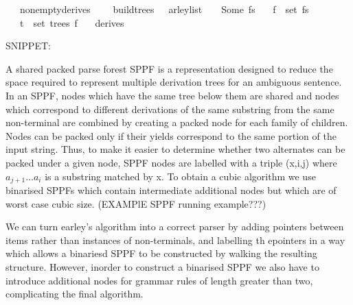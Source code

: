 \begin{isabellebody}
\ \ \ {\isachardoublequoteopen}nonempty{\isacharunderscore}{\kern0pt}derives\ {\isasymG}{\isachardoublequoteclose}\isanewline
\ \ \ {\isachardoublequoteopen}build{\isacharunderscore}{\kern0pt}trees\ {\isasymG}\ {\isasymomega}\ {\isacharparenleft}{\kern0pt}{\isasymE}arley{\isacharunderscore}{\kern0pt}list\ {\isasymG}\ {\isasymomega}{\isacharparenright}{\kern0pt}\ {\isacharequal}{\kern0pt}\ Some\ fs{\isachardoublequoteclose}\isanewline
\ \ \ {\isachardoublequoteopen}f\ {\isasymin}\ set\ fs{\isachardoublequoteclose}\isanewline
\ \ \ {\isachardoublequoteopen}t\ {\isasymin}\ set\ {\isacharparenleft}{\kern0pt}trees\ f{\isacharparenright}{\kern0pt}{\isachardoublequoteclose}\isanewline
\ \ \ {\isachardoublequoteopen}derives\ {\isasymG}\ {\isacharbrackleft}{\kern0pt}{\isasymSS}\ {\isasymG}{\isacharbrackright}{\kern0pt}\ {\isasymomega}{\isachardoublequoteclose}%
\isadelimproof
%
\endisadelimproof
%
\isatagproof
%
\endisatagproof
{\isafoldproof}%
%
\isadelimproof
%
\endisadelimproof
%
\begin{isamarkuptext}%
%
\end{isamarkuptext}\isamarkuptrue%
%
\isadelimdocument
%
\endisadelimdocument
%
\isatagdocument
%
\isamarkuptrue%
%
\endisatagdocument
{\isafolddocument}%
%
\isadelimdocument
%
\endisadelimdocument
%
\begin{isamarkuptext}%
SNIPPET:

A shared packed parse forest SPPF is a representation designed to reduce the space required to represent multiple derivation
trees for an ambiguous sentence. In an SPPF, nodes which have the same tree below them are shared and nodes which correspond
to different derivations of the same substring from the same non-terminal are combined by creating a packed node for each
family of children. Nodes can be packed only if their yields correspond to the same portion of the input string. Thus, to make it easier
to determine whether two alternates can be packed under a given node, SPPF nodes are labelled with a triple (x,i,j) where
$a_{j+1} \dots a_i$ is a substring matched by x. To obtain a cubic algorithm we use binarised SPPFs which contain intermediate additional
nodes but which are of worst case cubic size. (EXAMPlE SPPF running example???)

We can turn earley's algorithm into a correct parser by adding pointers between items rather than instances of non-terminals, and labelling th epointers
in a way which allows a binariesd SPPF to be constructed by walking the resulting structure. However, inorder to
construct a binarised SPPF we also have to introduce additional nodes for grammar rules of length greater than two,
complicating the final algorithm.%
\end{isamarkuptext}\isamarkuptrue%
%
\isadelimtheory
%
\endisadelimtheory
%
\isatagtheory
%
\endisatagtheory
{\isafoldtheory}%
%
\isadelimtheory
%
\endisadelimtheory
%
\end{isabellebody}%
